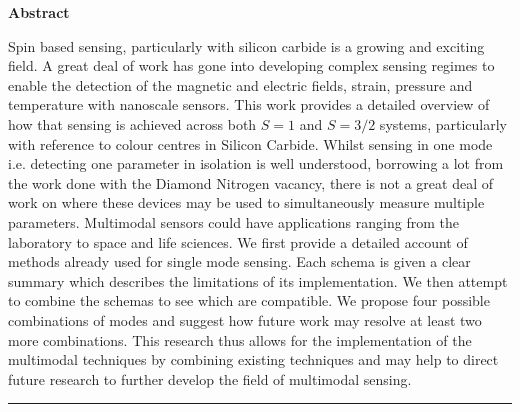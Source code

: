 \vspace*{\fill}
\begin{center}
\textrm{\bfseries\Huge Abstract}%
\end{center}%
Spin based sensing, particularly with silicon carbide is a growing and exciting field. A great deal of work has gone into developing complex sensing regimes to enable the detection of the magnetic and electric fields, strain, pressure and temperature with nanoscale sensors. 
This work provides a detailed overview of how that sensing is achieved across both $S=1$ and $S=3/2$ systems, particularly with reference to colour centres in Silicon Carbide. 
Whilst sensing in one mode i.e. detecting one parameter in isolation is well understood, borrowing a lot from the work done with the Diamond Nitrogen vacancy, there is not a great deal of work on where these devices may be used to simultaneously measure multiple parameters. 
Multimodal sensors could have applications ranging from the laboratory to space and life sciences. We first provide a detailed account of methods already used for single mode sensing. Each schema is given a clear summary which describes the limitations of its implementation. We then attempt to combine the schemas to see which are compatible.
%
We propose four possible combinations of modes and suggest how future work may resolve at least two more combinations. This research thus allows for the implementation of the multimodal techniques by combining existing techniques and may help to direct future research to further develop the field of multimodal sensing. 
\vspace{1em}
\begin{center}
    {\color{figcaption}\rule{0.75\textwidth}{0.1pt}}
\end{center}
